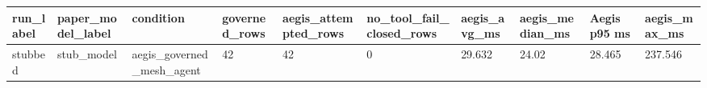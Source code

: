 \begin{tabular}{llllllllll}
 \hline
run\_label & paper\_model\_label & condition & governed\_rows & aegis\_attempted\_rows & no\_tool\_fail\_closed\_rows & aegis\_avg\_ms & aegis\_median\_ms & Aegis p95 ms & aegis\_max\_ms \\
 \hline
stubbed & stub\_model & aegis\_governed\_mesh\_agent & 42 & 42 & 0 & 29.632 & 24.02 & 28.465 & 237.546 \\
 \hline
\end{tabular}
